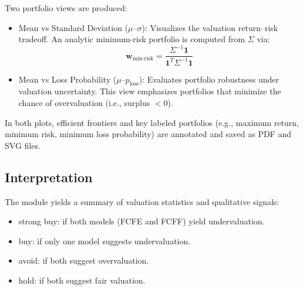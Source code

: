 Two portfolio views are produced:

\begin{itemize}
  \item Mean vs Standard Deviation ($\mu$–$\sigma$):
  Visualizes the valuation return–risk tradeoff. An analytic minimum-risk portfolio is computed from $\Sigma$ via:
  \[
  \mathbf{w}_{\text{min-risk}} = \frac{\Sigma^{-1} \mathbf{1}}{\mathbf{1}^T \Sigma^{-1} \mathbf{1}}
  \]

  \item Mean vs Loss Probability ($\mu$–$p_{\text{loss}}$):
  Evaluates portfolio robustness under valuation uncertainty. This view emphasizes portfolios that minimize the chance of overvaluation (i.e., surplus $< 0$).
\end{itemize}

In both plots, efficient frontiers and key labeled portfolios (e.g., maximum return, minimum risk, minimum loss probability) are annotated and saved as PDF and SVG files.

\subsection{Interpretation}

The module yields a summary of valuation statistics and qualitative signals:
\begin{itemize}
  \item strong buy: if both models (FCFE and FCFF) yield undervaluation.
  \item buy: if only one model suggests undervaluation.
  \item avoid: if both suggest overvaluation.
  \item hold: if both suggest fair valuation. 
\end{itemize}
